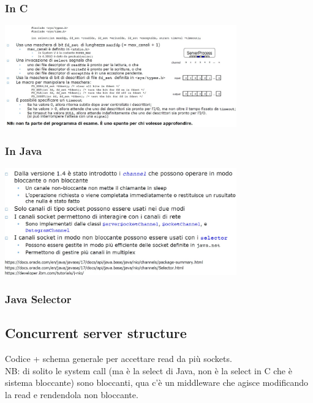 \subsubsection{In C}
\begin{center}
    \includegraphics[width=0.75\textwidth]{img/SelectSystemCall_C1.jpg}
\end{center}

\subsubsection{In Java}
\begin{center}
    \includegraphics[width=0.75\textwidth]{img/SelectSystemCall_Java1.jpg}
\end{center}

\subsubsection{Java Selector}

\subsection{Concurrent server structure}
Codice + schema generale per accettare read da più sockets.
\\NB: di solito le system call (ma è la select di Java, non è la select in C che è sistema bloccante) sono bloccanti, qua c'è un middleware che agisce modificando la read e rendendola non bloccante.

